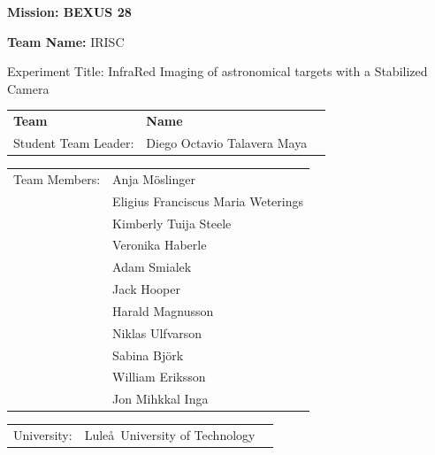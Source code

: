 \documentclass[a4paper,12pt,oneside]{article}
\begin{document}
\begin{flushleft}
\vspace{5pt}

\noindent \textbf{\hspace{-1pt}Mission: BEXUS 28} \\

\vspace{20pt}

{\hspace{-2pt}\noindent \Large{\textbf{Team Name:} } IRISC} \\

\vspace{20pt}

\hspace{-1pt}Experiment Title: InfraRed Imaging of astronomical targets with a Stabilized Camera\\

\vspace{20pt}
\begin{tabular}{p{} p{} p{}}
\textbf{Team} & \textbf{Name}  \\
Student Team Leader: & Diego Octavio Talavera Maya \\
\end{tabular}
\vspace{5pt}
\begin{tabular}{p{} p{}}
	Team Members:  	& Anja M\"oslinger \\
					& Eligius Franciscus Maria Weterings \\
					& Kimberly Tuija Steele \\
					& Veronika Haberle \\
					& Adam Smialek \\
					& Jack Hooper\\
					& Harald Magnusson \\
					& Niklas Ulfvarson \\
					& Sabina Bj\"ork \\
					& William Eriksson \\
					& Jon Mihkkal Inga \\
\end{tabular}

\begin{tabular}{p{} p{} p{}}
University: & Lule\aa \ University of Technology
\end{tabular}

\vspace{0.25cm} 


\end{flushleft}
\end{document}
